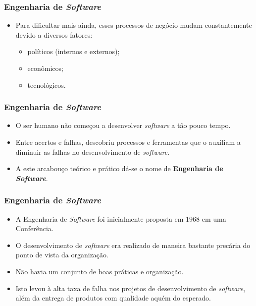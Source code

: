 \documentclass[11pt]{beamer}
\begin{document}
    \begin{frame}
      \frametitle{Engenharia de \textit{Software}}
      \begin{itemize}
        \item Para dificultar mais ainda, esses processos de negócio mudam constantemente devido a diversos fatores:
        \begin{itemize}
          \item políticos (internos e externos);
          \item econômicos;
          \item tecnológicos.
        \end{itemize}
      \end{itemize}
    \end{frame}
    
   \begin{frame}
      \frametitle{Engenharia de \textit{Software}}
      \begin{itemize}
        \item O ser humano não começou a desenvolver \textit{software} a tão pouco tempo.
        \item Entre acertos e falhas, descobriu processos e ferramentas que o auxiliam a diminuir as falhas no desenvolvimento de \textit{software}.
        \item A este arcabouço teórico e prático dá-se o nome de \textbf{Engenharia de \textit{Software}}.
      \end{itemize}
   \end{frame}
        
   \begin{frame}
      \frametitle{Engenharia de \textit{Software}}
      \begin{itemize}
        \item A Engenharia de \textit{Software} foi inicialmente proposta em 1968 em uma Conferência.
        \item O desenvolvimento de \textit{software} era realizado de maneira bastante precária do ponto de vista da organização.
        \item Não havia um conjunto de boas práticas e organização.
        \item Isto levou à alta taxa de falha nos projetos de desenvolvimento de \textit{software}, além da entrega de produtos com qualidade aquém do esperado.
      \end{itemize}
   \end{frame}   
   
\end{document}
